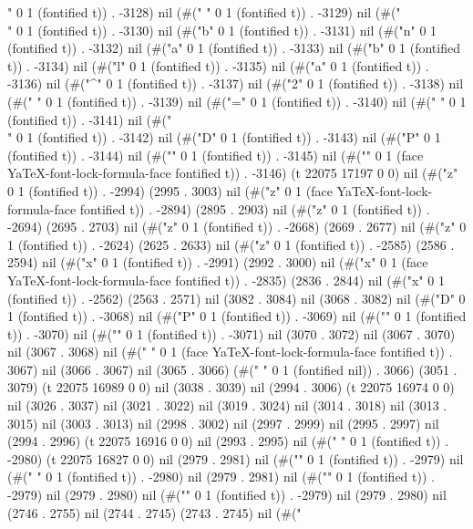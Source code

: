 " 0 1 (fontified t)) . -3128) nil (#(" " 0 1 (fontified t)) . -3129) nil (#("\\" 0 1 (fontified t)) . -3130) nil (#("b" 0 1 (fontified t)) . -3131) nil (#("n" 0 1 (fontified t)) . -3132) nil (#("a" 0 1 (fontified t)) . -3133) nil (#("b" 0 1 (fontified t)) . -3134) nil (#("l" 0 1 (fontified t)) . -3135) nil (#("a" 0 1 (fontified t)) . -3136) nil (#("^" 0 1 (fontified t)) . -3137) nil (#("2" 0 1 (fontified t)) . -3138) nil (#(" " 0 1 (fontified t)) . -3139) nil (#("=" 0 1 (fontified t)) . -3140) nil (#(" " 0 1 (fontified t)) . -3141) nil (#("\\" 0 1 (fontified t)) . -3142) nil (#("D" 0 1 (fontified t)) . -3143) nil (#("P" 0 1 (fontified t)) . -3144) nil (#("{" 0 1 (fontified t)) . -3145) nil (#("}" 0 1 (face YaTeX-font-lock-formula-face fontified t)) . -3146) (t 22075 17197 0 0) nil (#("z" 0 1 (fontified t)) . -2994) (2995 . 3003) nil (#("z" 0 1 (face YaTeX-font-lock-formula-face fontified t)) . -2894) (2895 . 2903) nil (#("z" 0 1 (fontified t)) . -2694) (2695 . 2703) nil (#("z" 0 1 (fontified t)) . -2668) (2669 . 2677) nil (#("z" 0 1 (fontified t)) . -2624) (2625 . 2633) nil (#("z" 0 1 (fontified t)) . -2585) (2586 . 2594) nil (#("x" 0 1 (fontified t)) . -2991) (2992 . 3000) nil (#("x" 0 1 (face YaTeX-font-lock-formula-face fontified t)) . -2835) (2836 . 2844) nil (#("x" 0 1 (fontified t)) . -2562) (2563 . 2571) nil (3082 . 3084) nil (3068 . 3082) nil (#("D" 0 1 (fontified t)) . -3068) nil (#("P" 0 1 (fontified t)) . -3069) nil (#("{" 0 1 (fontified t)) . -3070) nil (#("}" 0 1 (fontified t)) . -3071) nil (3070 . 3072) nil (3067 . 3070) nil (3067 . 3068) nil (#("
" 0 1 (face YaTeX-font-lock-formula-face fontified t)) . 3067) nil (3066 . 3067) nil (3065 . 3066) (#(" " 0 1 (fontified nil)) . 3066) (3051 . 3079) (t 22075 16989 0 0) nil (3038 . 3039) nil (2994 . 3006) (t 22075 16974 0 0) nil (3026 . 3037) nil (3021 . 3022) nil (3019 . 3024) nil (3014 . 3018) nil (3013 . 3015) nil (3003 . 3013) nil (2998 . 3002) nil (2997 . 2999) nil (2995 . 2997) nil (2994 . 2996) (t 22075 16916 0 0) nil (2993 . 2995) nil (#(" " 0 1 (fontified t)) . -2980) (t 22075 16827 0 0) nil (2979 . 2981) nil (#("" 0 1 (fontified t)) . -2979) nil (#(" " 0 1 (fontified t)) . -2980) nil (2979 . 2981) nil (#("" 0 1 (fontified t)) . -2979) nil (2979 . 2980) nil (#("" 0 1 (fontified t)) . -2979) nil (2979 . 2980) nil (2746 . 2755) nil (2744 . 2745) (2743 . 2745) nil (#("
